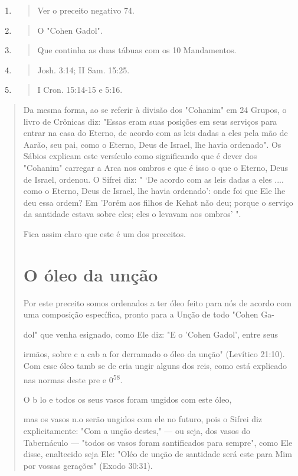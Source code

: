 \begin{enumerate}
\def\labelenumi{\arabic{enumi}.}
\setcounter{enumi}{52}
\item
 \begin{quote}
 Ver o preceito negativo 74.
 \end{quote}
\item
 \begin{quote}
 O "Cohen Gadol".
 \end{quote}
\item
 \begin{quote}
 Que continha as duas tábuas com os 10 Mandamentos.
 \end{quote}
\item
 \begin{quote}
 Josh. 3:14; II Sam. 15:25.
 \end{quote}
\item
 \begin{quote}
 I Cron. 15:14-15 e 5:16.
 \end{quote}
\end{enumerate}

\begin{quote}Da mesma forma, ao se referir à divisão dos "Cohanim" em 24 Gru­pos, o
livro de Crônicas diz: "Essas eram suas posições em seus serviços para
entrar na casa do Eterno, de acordo com as leis dadas a eles pela mão de
Aarão, seu pai, como o Eterno, Deus de Israel, lhe havia ordenado". Os
Sábios expli­cam este versículo como significando que é dever dos
"Cohanim" carregar a Arca nos ombros e que é isso o que o Eterno, Deus
de Israel, ordenou. O Sifrei diz: " `De acordo com as leis dadas a eles
.... como o Eterno, Deus de Israel, lhe havia ordenado': onde foi que
Ele lhe deu essa ordem? Em 'Porém aos fi­lhos de Kehat não deu; porque o
serviço da santidade estava sobre eles; eles o levavam aos ombros' ".

Fica assim claro que este é um dos preceitos.

\section{O óleo da unção}

Por este preceito somos ordenados a ter óleo feito para nós de acor­do
com uma composição específica, pronto para a Unção de todo "Cohen Ga-

dol" que venha esignado, como Ele diz: "E o 'Cohen Gadol', entre seus

irmãos, sobre c a cab a for derramado o óleo da unção" (Levítico 21:10).
Com esse óleo tamb se de eria ungir alguns dos reis, como está explicado
nas nor­mas deste pre e 0\textsuperscript{58}.

O b lo e todos os seus vasos foram ungidos com este óleo,

mas os vasos n.o serão ungidos com ele no futuro, pois
o Sifrei diz explicita­mente: "Com a unção destes," --- ou seja, dos
vasos do Tabernáculo --- "todos os vasos foram santificados para
sempre", como Ele disse, enaltecido seja Ele: "Oléo de unção de
santidade será este para Mim por vossas gerações" (Exodo 30:31).
\end{quote}

